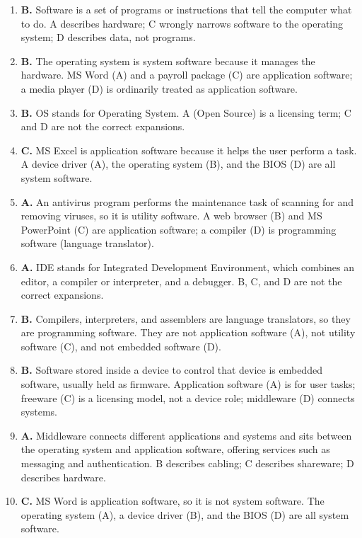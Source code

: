 \begin{enumerate}[label=\textbf{Q\arabic*.}, leftmargin=*]
\item \textbf{B.} Software is a set of programs or instructions that tell the
  computer what to do. A describes hardware; C wrongly narrows software to the
  operating system; D describes data, not programs.
\item \textbf{B.} The operating system is system software because it manages
  the hardware. MS Word (A) and a payroll package (C) are application
  software; a media player (D) is ordinarily treated as application software.
\item \textbf{B.} OS stands for Operating System. A (Open Source) is a
  licensing term; C and D are not the correct expansions.
\item \textbf{C.} MS Excel is application software because it helps the user
  perform a task. A device driver (A), the operating system (B), and the BIOS
  (D) are all system software.
\item \textbf{A.} An antivirus program performs the maintenance task of
  scanning for and removing viruses, so it is utility software. A web browser
  (B) and MS PowerPoint (C) are application software; a compiler (D) is
  programming software (language translator).
\item \textbf{A.} IDE stands for Integrated Development Environment, which
  combines an editor, a compiler or interpreter, and a debugger. B, C, and D
  are not the correct expansions.
\item \textbf{B.} Compilers, interpreters, and assemblers are language
  translators, so they are programming software. They are not application
  software (A), not utility software (C), and not embedded software (D).
\item \textbf{B.} Software stored inside a device to control that device is
  embedded software, usually held as firmware. Application software (A) is
  for user tasks; freeware (C) is a licensing model, not a device role;
  middleware (D) connects systems.
\item \textbf{A.} Middleware connects different applications and systems and
  sits between the operating system and application software, offering
  services such as messaging and authentication. B describes cabling; C
  describes shareware; D describes hardware.
\item \textbf{C.} MS Word is application software, so it is not system
  software. The operating system (A), a device driver (B), and the BIOS (D)
  are all system software.

\end{enumerate}
